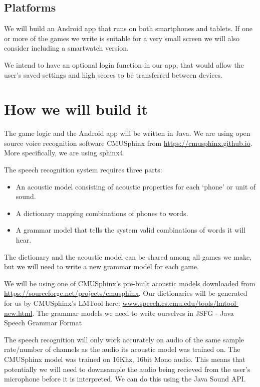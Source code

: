 \documentclass[11pt, oneside]{article}
\begin{document}
\subsection*{Platforms}

We will build an Android app that runs on both smartphones and
tablets. If one or more of the games we write is suitable for a very
small screen we will also consider including a smartwatch version.

We intend to have an optional login function in our app, that would
allow the user's saved settings and high scores to be transferred between
devices.


\section*{How we will build it}

The game logic and the Android app will be written in Java. We are
using open source voice recognition software CMUSphinx from
\url{https://cmusphinx.github.io}. More specifically, we are using sphinx4.

The speech recognition system requires three parts:
\begin{itemize}
\item An acoustic model consisting of acoustic properties for each
  `phone' or unit of sound.
\item A dictionary mapping combinations of phones to words.
\item A grammar model that tells the system valid combinations of
  words it will hear.
\end{itemize}

The dictionary and the acoustic model can be shared among all games we
make, but we will need to write a new grammar model for each game.

We will be using one of CMUSphinx's pre-built acoustic models
downloaded from \url{https://sourceforge.net/projects/cmusphinx}. Our
dictionaries will be generated for us by CMUSphinx's LMTool here:
\url{www.speech.cs.cmu.edu/tools/lmtool-new.html}. The grammar models
we need to write ourselves in JSFG - Java Speech Grammar Format

The speech recognition will only work accurately on audio of the same
sample rate/number of channels as the audio its acoustic model was
trained on. The CMUSphinx model was trained on 16Khz, 16bit Mono
audio. This means that potentially we will need to downsample the
audio being recieved from the user's microphone before it is
interpreted. We can do this using the Java Sound API.
\end{document}
